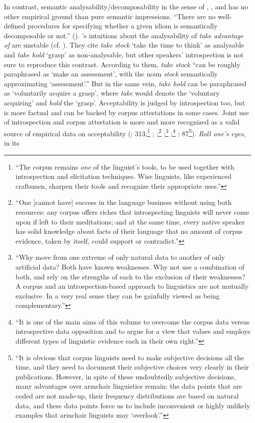 \documentclass[output=paper]{langsci/langscibook}
\begin{document}
In contrast, semantic analysability\slash decomposability in the sense of   \citet{Gibbs1989}, \cite[508]{Nunberg1994}, \cite{Sag:2002} and  \cite{Baldwin2010} has no other empirical ground than pure semantic impressions. “There are no well-defined procedures for specifying whether a given idiom is semantically decomposable or not.”  (\citealt[106]{Gibbs1989}). \cite[523--524]{Nunberg1994}'s intuitions about the analysability of \textit{take advantage of} are unstable (cf. ). They cite \textit{take stock} ‘take the time to think’ as analysable and\textit{ take hold} ‘grasp’ as non-analysable, but other speakers’ introspection is not sure to reproduce this contrast. According to them, \textit{take stock} “can be roughly paraphrased as ‘make an assessment’, with the noun \textit{stock} semantically approximating ‘assessment’.” But in the same vein, \textit{take hold} can be paraphrased as ‘voluntarily acquire a grasp’, where \textit{take} would denote the ‘voluntary acquiring’ and \textit{hold} the ‘grasp’. Acceptability is judged by introspection too, but is more factual and can be backed by corpus attestations in some cases. Joint use of introspection and corpus attestation is more and more recognized as a valid source of empirical data on acceptability (\citealt{Johansson1991}: 313;\footnote{“The corpus remains \textit{one} of the linguist’s tools, to be used together with introspection and elicitation techniques. Wise linguists, like experienced craftsmen, sharpen their tools and recognize their appropriate uses.”} \citealt[58]{Fillmore1992armchair}; \citeyear[1]{Fillmore2001};\footnote{“One [cannot have] success in the language business without using both resources: any corpus offers riches that introspecting linguists will never come upon if left to their meditations; and at the same time, every native speaker has solid knowledge about facts of their language that no amount of corpus evidence, taken by itself, could support or contradict.”}   \citealt[16]{McEnery1996};\footnote{“Why move from one extreme of only natural data to another of only artificial data? Both have known weaknesses. Why not use a combination of both, and rely on the strengths of each to the exclusion of their weaknesses? A corpus and an introspection-based approach to linguistics are not mutually exclusive. In a very real sense they can be gainfully viewed as being complementary.”}  \citealt{Kepser2005};\footnote{“It is one of the main aims of this volume to overcome the corpus data versus introspective data opposition and to argue for a view that values and employs different types of linguistic evidence each in their own right.”} \citealt{Gries2011}: 87\footnote{“It is obvious that corpus linguists need to make subjective decisions all the time, and they need to document their subjective choices very clearly in their publications. However, in spite of these undoubtedly subjective decisions, many advantages over armchair linguistics remain: the data points that are coded are not made-up, their frequency distributions are based on natural data, and these data points force us to include inconvenient or highly unlikely examples that armchair linguists may ‘overlook’.”}). \textit{Roll one’s eyes}, in its 
\end{document}
